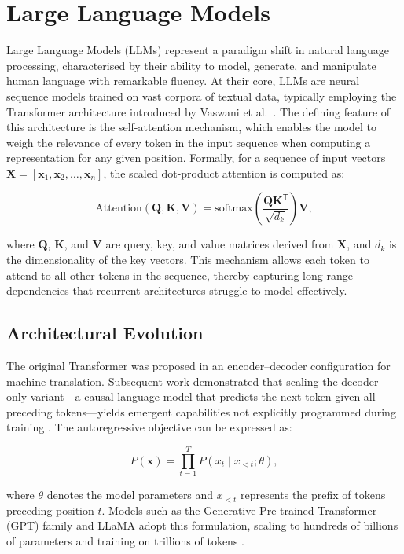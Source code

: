 \section{Large Language Models}

Large Language Models (LLMs) represent a paradigm shift in natural language processing, characterised by their ability to model, generate, and manipulate human language with remarkable fluency. At their core, LLMs are neural sequence models trained on vast corpora of textual data, typically employing the Transformer architecture introduced by Vaswani et al.\ \cite{VasShaPar:aiayn17}. The defining feature of this architecture is the self-attention mechanism, which enables the model to weigh the relevance of every token in the input sequence when computing a representation for any given position. Formally, for a sequence of input vectors \(\mathbf{X} = [\mathbf{x}_1, \mathbf{x}_2, \dots, \mathbf{x}_n]\), the scaled dot-product attention is computed as:

\[
\mathrm{Attention}(\mathbf{Q}, \mathbf{K}, \mathbf{V}) = \mathrm{softmax}\left(\frac{\mathbf{Q}\mathbf{K}^{\mathsf{T}}}{\sqrt{d_k}}\right)\mathbf{V},
\]

where \(\mathbf{Q}\), \(\mathbf{K}\), and \(\mathbf{V}\) are query, key, and value matrices derived from \(\mathbf{X}\), and \(d_k\) is the dimensionality of the key vectors. This mechanism allows each token to attend to all other tokens in the sequence, thereby capturing long-range dependencies that recurrent architectures struggle to model effectively.

\subsection{Architectural Evolution}

The original Transformer was proposed in an encoder--decoder configuration for machine translation. Subsequent work demonstrated that scaling the decoder-only variant---a causal language model that predicts the next token given all preceding tokens---yields emergent capabilities not explicitly programmed during training \cite{brown2020languagemodelsfewshotlearners}. The autoregressive objective can be expressed as:

\[
P(\mathbf{x}) = \prod_{t=1}^{T} P(x_t \mid x_{<t}; \theta),
\]

where \(\theta\) denotes the model parameters and \(x_{<t}\) represents the prefix of tokens preceding position \(t\). Models such as the Generative Pre-trained Transformer (GPT) family \cite{radford2018improving, brown2020languagemodelsfewshotlearners} and LLaMA \cite{touvron2023llama} adopt this formulation, scaling to hundreds of billions of parameters and training on trillions of tokens \cite{hoffmann2022training}.

